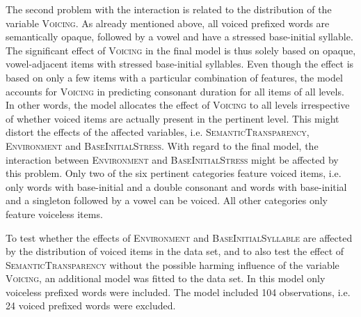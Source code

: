 The second problem with the interaction  
is related to the distribution of the variable \textsc{Voicing}. 
 As already mentioned above, all voiced prefixed words are semantically opaque, followed by a vowel and have a stressed base-initial syllable. The significant effect of \textsc{Voicing} in the final model is thus solely based on opaque, vowel-adjacent items with stressed base-initial syllables. Even though the effect is based on only a few items with a particular combination of features, the model accounts for \textsc{Voicing} in predicting consonant duration for all items of all levels. In other words, the model allocates the effect of \textsc{Voicing} to all levels irrespective of whether voiced items are actually present in the pertinent level. This might distort the effects of the affected variables, i.e. \textsc{SemanticTransparency}, \textsc{Environment} and \textsc{BaseInitialStress}. 
  With regard to the final model, the interaction between \textsc{Environment} and \textsc{BaseInitialStress} might be affected by this problem.
  Only two of the six pertinent categories feature voiced items, i.e. only words with base-initial  and a double consonant and words with base-initial  and a singleton followed by a vowel can be voiced. All other categories only feature voiceless items.
  
  
  
  To test whether the effects of \textsc{Environment} and \textsc{BaseInitialSyllable} are affected by the distribution of voiced items in the data set, and to also test the effect of \textsc{SemanticTransparency} without the possible harming influence of the variable \textsc{Voicing}, an additional model was fitted to the data set. In this model only voiceless prefixed words were included. The model included 104 observations, i.e. 24 voiced prefixed words were excluded. 
  
  


